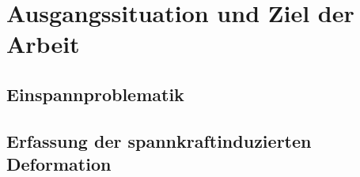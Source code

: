\documentclass[../main.tex]{subfiles}
\begin{document}
\section{Ausgangssituation und Ziel der Arbeit}

\subsection{Einspannproblematik}

\subsection{Erfassung der spannkraftinduzierten Deformation}
\end{document}
